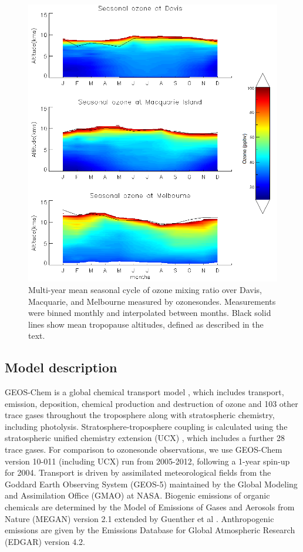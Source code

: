 \documentclass{article}
\begin{document}
    \begin{figure}[!htbp]
      \begin{center}
      \includegraphics[width=0.8\columnwidth]{figures/seasonaltropozone}
      \caption{
      Multi-year mean seasonal cycle of ozone mixing ratio over Davis, Macquarie, and Melbourne measured by ozonesondes.
      Measurements were binned monthly and interpolated between months.
      Black solid lines show mean tropopause altitudes, defined as described in the text.
      }
      \label{fig:seasonaltropozone}
      \end{center}
    \end{figure}

  \subsection{Model description}
    \label{Section:GEOSChemDescription}
    GEOS-Chem is a global chemical transport model \citep{Bey2001}, which includes transport, emission, deposition, chemical production and destruction of ozone and 103 other trace gases throughout the troposphere along with stratospheric chemistry, including photolysis. 
    Stratosphere-troposphere coupling is calculated using the stratospheric unified chemistry extension (UCX) \citep{Eastham2014}, which includes a further 28 trace gases.
    For comparison to ozonesonde observations, we use GEOS-Chem version 10-011 (including UCX) run from 2005-2012, following a 1-year spin-up for 2004.
    Transport is driven by assimilated meteorological fields from the Goddard Earth Observing System (GEOS-5) maintained by the Global Modeling and Assimilation Office (GMAO) at NASA.
    Biogenic emissions of organic chemicals are determined by the Model of Emissions of Gases and Aerosols from Nature (MEGAN) version 2.1 extended by Guenther et al \citep{Guenther2012}.
    Anthropogenic emissions are given by the Emissions Database for Global Atmospheric Research (EDGAR) version 4.2.
  
\end{document}
